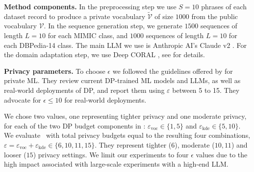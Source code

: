 \noindent\textbf{Method components.}
In the preprocessing step we use $S=10$ phrases of each dataset record to produce a private vocabulary $\widetilde{\mathcal{V}}$ of size $1000$ from the public vocabulary $\mathcal V$. In the sequence generation step, we generate $1500$ sequences of length $L=10$ for each MIMIC class, and $1000$ sequences of length $L=10$ for each DBPedia-14 class. The main LLM we use is Anthropic AI's Claude v2 \cite{ClaudeLink}.
For the domain adaptation step, we use Deep CORAL \cite{sun2016deep}, see  for details.

\noindent\textbf{Privacy parameters.}
To choose $\epsilon$ we followed the guidelines offered by \cite[Section 5]{ponomareva2023dp} for private ML. They review current DP-trained ML models and LLMs, as well as real-world deployments of DP, and report them using $\varepsilon$ between 5 to 15. They advocate for $\epsilon\leq10$ for real-world deployments.

We chose two values, one representing tighter privacy and one moderate privacy, for each of the two DP budget components in \alg: $\varepsilon_{\mathrm{voc}}\in\{1,5\}$ and $\varepsilon_{\mathrm{kde}}\in\{5,10\}$. 
We evaluate \alg\ with total privacy budgets equal to the resulting four combinations, $\varepsilon=\varepsilon_{\mathrm{voc}}+\varepsilon_{\mathrm{kde}}\in\{6,10,11,15\}$. 
They represent tighter ($6$), moderate ($10,11$) and looser ($15$) privacy settings. 
We limit our experiments to four $\epsilon$ values due to the high impact associated with large-scale experiments with a high-end LLM. 


